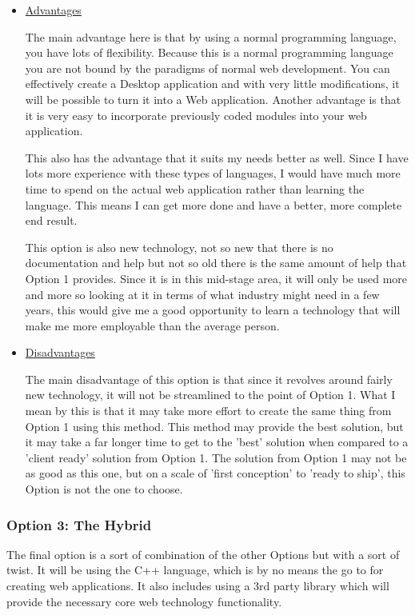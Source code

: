 \begin{itemize}
\item{
\underline{Advantages}

The main advantage here is that by using a normal programming language, you have lots of flexibility. Because this is a normal programming language you are not bound by the paradigms of normal web development. You can effectively create a Desktop application and with very little modifications, it will be possible to turn it into a Web application. Another advantage is that it is very easy to incorporate previously coded modules into your web application. 

This also has the advantage that it suits my needs better as well. Since I have lots more experience with these types of languages, I would have much more time to spend on the actual web application rather than learning the language. This means I can get more done and have a better, more complete end result.

This option is also new technology, not so new that there is no documentation and help but not so old there is the same amount of help that Option 1 provides. Since it is in this mid-stage area, it will only be used more and more so looking at it in terms of what industry might need in a few years, this would give me a good opportunity to learn a technology that will make me more employable than the average person.
}
\item{
\underline{Disadvantages}

The main disadvantage of this option is that since it revolves around fairly new technology, it will not be streamlined to the point of Option 1. What I mean by this is that it may take more effort to create the same thing from Option 1 using this method. This method may provide the best solution, but it may take a far longer time to get to the 'best' solution when compared to a 'client ready' solution from Option 1. The solution from Option 1 may not be as good as this one, but on a scale of 'first conception' to 'ready to ship', this Option is not the one to choose.  
}
\end{itemize}


\subsubsection{Option 3: The Hybrid}

The final option is a sort of combination of the other Options but with a sort of twist. It will be using the C++ language, which is by no means the go to for creating web applications. It also includes using a 3rd party library which will provide the necessary core web technology functionality.

